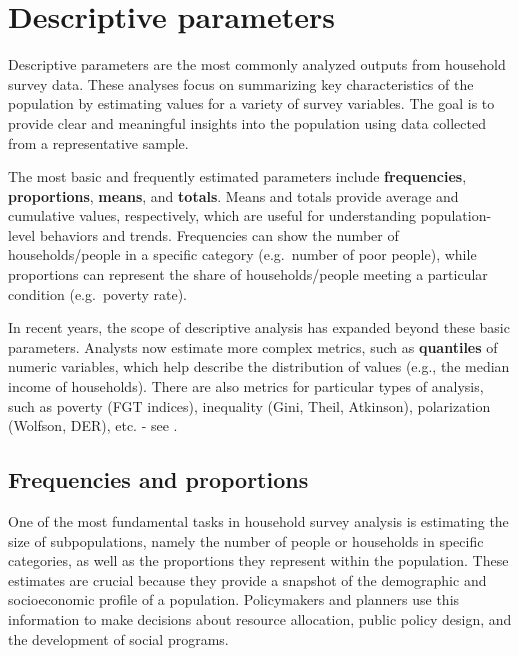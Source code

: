 \documentclass[
  12pt,
]{book}
\begin{document}
\hypertarget{descriptive-parameters}{%
\chapter{Descriptive parameters}\label{descriptive-parameters}}

Descriptive parameters are the most commonly analyzed outputs from household survey data. These analyses focus on summarizing key characteristics of the population by estimating values for a variety of survey variables. The goal is to provide clear and meaningful insights into the population using data collected from a representative sample.

The most basic and frequently estimated parameters include \textbf{frequencies}, \textbf{proportions}, \textbf{means}, and \textbf{totals}. Means and totals provide average and cumulative values, respectively, which are useful for understanding population-level behaviors and trends. Frequencies can show the number of households/people in a specific category (e.g.~number of poor people), while proportions can represent the share of households/people meeting a particular condition (e.g.~poverty rate).

In recent years, the scope of descriptive analysis has expanded beyond these basic parameters. Analysts now estimate more complex metrics, such as \textbf{quantiles} of numeric variables, which help describe the distribution of values (e.g., the median income of households). There are also metrics for particular types of analysis, such as poverty (FGT indices), inequality (Gini, Theil, Atkinson), polarization (Wolfson, DER), etc. - see \citet{Jacob2024}.

\hypertarget{frequencies-and-proportions}{%
\section{Frequencies and proportions}\label{frequencies-and-proportions}}

One of the most fundamental tasks in household survey analysis is estimating the size of subpopulations, namely the number of people or households in specific categories, as well as the proportions they represent within the population. These estimates are crucial because they provide a snapshot of the demographic and socioeconomic profile of a population. Policymakers and planners use this information to make decisions about resource allocation, public policy design, and the development of social programs.
\end{document}

